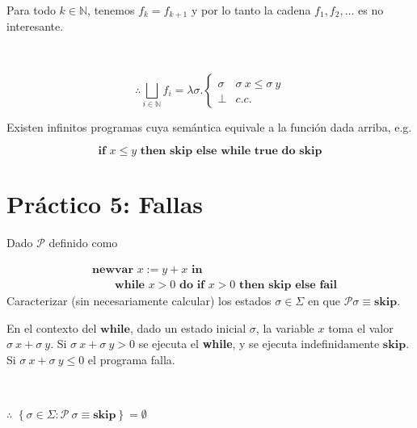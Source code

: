\documentclass[a4paper, 12pt]{article}
\begin{document}
Para todo $k \in \mathbb{N}$, tenemos $f_k = f_{k+1}$ y por lo
tanto la cadena $f_1, f_2, \ldots$ es no interesante. 

~


\begin{equation*}
  \therefore \bigsqcup_{i \in \mathbb{N}} f_i = \lambda \sigma . \begin{cases}
    \sigma & \sigma ~ x \leq \sigma ~ y \\ 
    \bot  & c.c.
  \end{cases}
\end{equation*}

Existen infinitos programas cuya semántica equivale a la función dada arriba,
e.g.

\begin{equation*}
  \textbf{if } x \leq y \textbf{ then } \textbf{skip} \textbf{ else }
  \textbf{while true do skip} 
\end{equation*}

\pagebreak 

\section{Práctico 5: Fallas}

\begin{myframe}
  Dado $\mathcal{P}$ definido como

  \begin{align*}
    &\textbf{newvar } x := y + x \textbf{ in } \\ 
    &\qquad\textbf{while } x > 0 \textbf{ do } \textbf{if } x > 0 \textbf{ then
    } \textbf{skip} \textbf{ else } \textbf{fail}
  \end{align*}
Caracterizar (sin necesariamente calcular) los estados $\sigma \in \Sigma$ en
que $\mathcal{P}\sigma \equiv \textbf{skip}$.
\end{myframe}

En el contexto del $\textbf{while}$, dado un estado inicial $\sigma$, la
variable $x$ toma el valor $\sigma ~ x + \sigma ~ y$. Si $\sigma ~ x + \sigma ~
y > 0$ se ejecuta el \textbf{while}, y se ejecuta indefinidamente
$\textbf{skip}$. Si $\sigma ~ x + \sigma ~ y \leq 0$ el programa falla.

~

$\therefore $ $\left\{ \sigma \in \Sigma : \mathcal{P}~ \sigma \equiv
\textbf{skip} \right\} = \emptyset$

\pagebreak 
\end{document}
